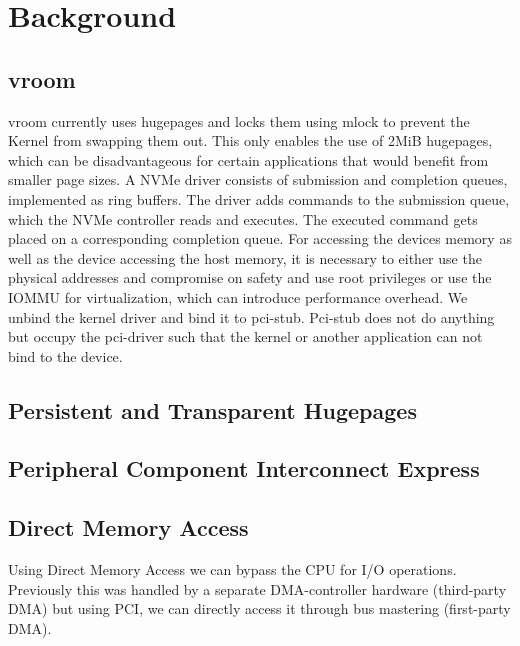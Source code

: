 \chapter{Background}

\section{vroom}
vroom currently uses hugepages and locks them using mlock to prevent the Kernel from swapping them out.
This only enables the use of 2MiB hugepages, which can be disadvantageous for certain applications that would benefit from smaller page sizes.
A NVMe driver consists of submission and completion queues, implemented as ring buffers.
The driver adds commands to the submission queue, which the NVMe controller reads and executes.
The executed command gets placed on a corresponding completion queue.
For accessing the devices memory as well as the device accessing the host memory, it is necessary to either use the physical addresses and compromise on safety and use root privileges or use the IOMMU for virtualization, which can introduce performance overhead.
We unbind the kernel driver and bind it to pci-stub. Pci-stub does not do anything but occupy the pci-driver such that the kernel or another application can not bind to the device.

\section{Persistent and Transparent Hugepages}

\section{Peripheral Component Interconnect Express}

\section{Direct Memory Access}
Using Direct Memory Access we can bypass the CPU for I/O operations. Previously this was handled by a separate DMA-controller hardware (third-party DMA) but using PCI, we can directly access it through bus mastering (first-party DMA).

